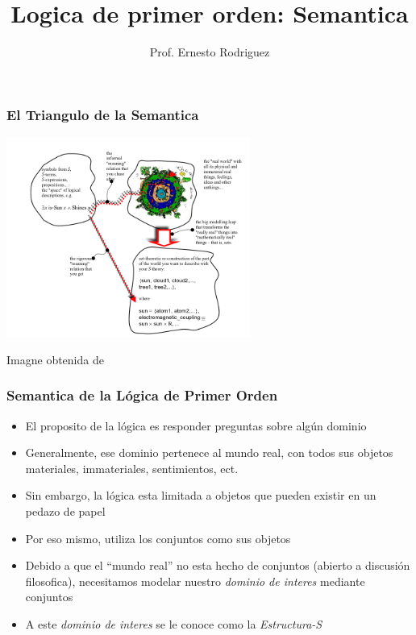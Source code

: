 \documentclass{beamer}
\title{Logica de primer orden: Semantica}
\author{Prof. Ernesto Rodriguez}
\institute{
    Universidad del Itsmo \\
    \medskip \textit{erodriguez@unis.edu.gt}
}
\date[\today]{}
\begin{document}
\begin{frame}
\titlepage
\end{frame}

\begin{frame}
    \frametitle{El Triangulo de la Semantica}
    \begin{center}
    \includegraphics[width=8cm]{triangulo.png}
    \end{center}
    \tiny{Imagne obtenida de \cite{FLL}}
\end{frame}

\begin{frame}
    \frametitle{Semantica de la L\'ogica de Primer Orden}
    \begin{itemize}
        \item{El proposito de la l\'ogica es responder preguntas sobre alg\'un
            dominio}
        \item{Generalmente, ese dominio pertenece al mundo real, con todos sus
            objetos materiales, immateriales, sentimientos, ect.}
        \item{Sin embargo, la l\'ogica esta limitada a objetos que pueden existir
            en un pedazo de papel}
        \item{Por eso mismo, utiliza los conjuntos como sus objetos}
        \item{Debido a que el ``mundo real'' no esta hecho de conjuntos (abierto a discusi\'on filosofica),
            necesitamos modelar nuestro \emph{dominio de interes} mediante conjuntos}
        \item{A este \emph{dominio de interes} se le conoce como la \emph{Estructura-S}}
    \end{itemize}
\end{frame}
\end{document}
